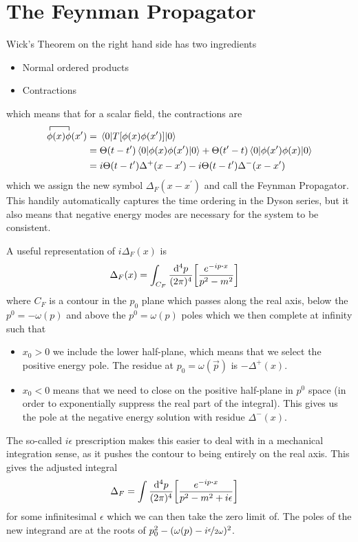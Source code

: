 \documentclass[notes.tex]{subfiles}
\begin{document}
\section{The Feynman Propagator}\label{sec:rqft_interactions_feynman-prop}
Wick's Theorem on the right hand side has two ingredients
\begin{itemize}
	\item Normal ordered products
	\item Contractions
\end{itemize}
which means that for a scalar field, the contractions are
\begin{align*}
	\contraction{}{\phi}{(x)}{\phi}\phi(x)\phi(x^\prime) &= \mel{0}{T\qty[\phi(x)\phi(x^\prime)]}{0}\\
	&= \Theta(t-t^\prime)\expval{\phi(x)\phi(x^\prime)}{0} + \Theta(t^\prime-t)\expval{\phi(x^\prime)\phi(x)}{0}\\
	&= i\Theta(t-t^\prime)\Delta^+(x-x^\prime) - i\Theta(t-t^\prime)\Delta^-(x-x^\prime)
\end{align*}
which we assign the new symbol $\Delta_F(x-x^\prime)$ and call the Feynman Propagator.
This handily automatically captures the time ordering in the Dyson series, but it also means that negative energy modes are necessary for the system to be consistent.

A useful representation of $i\Delta_F(x)$ is 
\begin{align*}
	\Delta_F(x) &= \int_{C_F} \frac{\dd[4]{p}}{(2\pi)^4}\qty[\frac{e^{-ip\vdot{x}}}{p^2 - m^2}]
\end{align*}
where $C_F$ is a contour in the $p_0$ plane which passes along the real axis, below the $p^0 = -\omega(p)$ and above the $p^0=\omega(p)$ poles which we then complete at infinity such that 
\begin{itemize}
	\item $x_0>0$ we include the lower half-plane, which means that we select the positive energy pole.
	The residue at $p_0 = \omega(\vec{p})$ is $-\Delta^+(x)$.
	\item $x_0 < 0$ means that we need to close on the positive half-plane in $p^0$ space (in order to exponentially suppress the real part of the integral). This gives us the pole at the negative energy solution with residue $\Delta^-(x)$.
\end{itemize}

The so-called $i\epsilon$ prescription makes this easier to deal with in a mechanical integration sense, as it pushes the contour to being entirely on the real axis.
This gives the adjusted integral
\begin{align*}
	\Delta_F &= \int\frac{\dd[4]{p}}{(2\pi)^4} \qty[\frac{e^{-ip\vdot{x}}}{p^2 - m^2 + i\epsilon}]
\end{align*}
for some infinitesimal $\epsilon$ which we can then take the zero limit of. 
The poles of the new integrand are at the roots of $p_0^2 - (\omega(p) - i\nicefrac{\epsilon}{2\omega})^2$.
\end{document}
